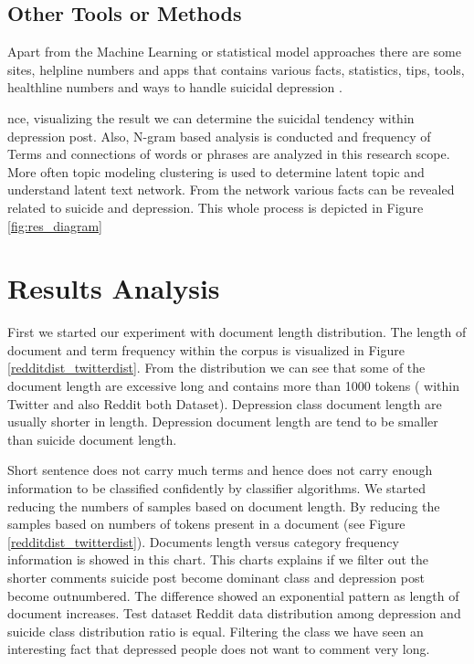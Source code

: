 \documentclass[sn-mathphys,Numbered]{sn-jnl}%
\theoremstyle{thmstyleone}%
\theoremstyle{thmstyletwo}%
\theoremstyle{thmstylethree}%
\begin{document}
\subsection{Other Tools or Methods}
Apart from the Machine Learning or statistical model approaches there are some sites, helpline numbers and apps \cite{martinengo2019suicide} that contains various facts, statistics, tips, tools, healthline numbers and ways to handle suicidal depression \cite{suicidaldepression_online}. 
  
nce, visualizing the result we can determine the suicidal tendency within depression post. Also, N-gram based analysis is conducted and frequency of Terms and connections of words or phrases are analyzed in this research scope. More often topic modeling clustering is used to determine latent topic and understand latent text network. From the network various facts can be revealed related to suicide and depression. This whole process is depicted in Figure \ref{fig:res_diagram}


\section{Results Analysis}\label{sec2}
First we started our experiment with document length distribution. The length of document and term frequency within the corpus is visualized in Figure \ref{redditdist_twitterdist}. From the distribution we can see that some of the document length are excessive long and contains more than 1000 tokens ( within Twitter and also Reddit both Dataset). Depression class document length are usually shorter in length. Depression document length are tend to be smaller than suicide document length. 

Short sentence does not carry much terms and hence does not carry enough information to be classified confidently by classifier algorithms. We started reducing the numbers of samples based on document length. By reducing the samples based on numbers of tokens present in a document (see Figure \ref{redditdist_twitterdist}). Documents length versus category frequency information is showed in this chart. This charts explains if we filter out the shorter comments suicide post become dominant class and depression post become outnumbered. The difference showed an exponential pattern as length of document increases. Test dataset Reddit data distribution among depression and suicide class distribution ratio is equal. Filtering the class we have seen an interesting fact that depressed people does not want to comment very long. 
\end{document}

